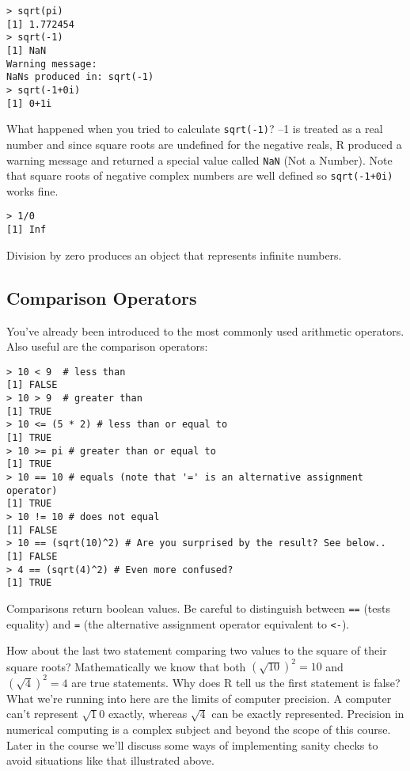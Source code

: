 \documentclass{article}
\begin{document}
\begin{lstlisting}
> sqrt(pi)
[1] 1.772454
> sqrt(-1)
[1] NaN
Warning message:
NaNs produced in: sqrt(-1) 
> sqrt(-1+0i)
[1] 0+1i
\end{lstlisting}
What happened when you tried to calculate \lstinline!sqrt(-1)!? --1 is
treated as a real number and since square roots are undefined for the
negative reals, R produced a warning message and returned a special
value called \lstinline!NaN! (Not a Number). Note that square roots of
negative complex numbers are well defined so \lstinline!sqrt(-1+0i)!
works fine.

\begin{lstlisting}
> 1/0
[1] Inf
\end{lstlisting}
Division by zero produces an object that represents infinite numbers.

\subsection{Comparison Operators}

You've already been introduced to the most commonly used arithmetic
operators. Also useful are the comparison operators:

\begin{lstlisting}
> 10 < 9  # less than
[1] FALSE
> 10 > 9  # greater than
[1] TRUE
> 10 <= (5 * 2) # less than or equal to
[1] TRUE
> 10 >= pi # greater than or equal to
[1] TRUE
> 10 == 10 # equals (note that '=' is an alternative assignment operator)
[1] TRUE
> 10 != 10 # does not equal
[1] FALSE
> 10 == (sqrt(10)^2) # Are you surprised by the result? See below..
[1] FALSE
> 4 == (sqrt(4)^2) # Even more confused?
[1] TRUE
\end{lstlisting}
Comparisons return boolean values. Be careful to distinguish between
\lstinline!==! (tests equality) and \lstinline!=! (the alternative
assignment operator equivalent to \lstinline!<-!).

How about the last two statement comparing two values to the square of
their square roots? Mathematically we know that both
$(\sqrt{10})^2 = 10$ and $(\sqrt{4})^2 = 4$ are true statements. Why
does R tell us the first statement is false? What we're running into
here are the limits of computer precision. A computer can't represent
$\sqrt 10$ exactly, whereas $\sqrt 4$ can be exactly represented.
Precision in numerical computing is a complex subject and beyond the
scope of this course. Later in the course we'll discuss some ways of
implementing sanity checks to avoid situations like that illustrated
above.
\end{document}
